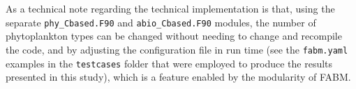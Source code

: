 \documentclass[gmd, manuscript]{copernicus}
\begin{document}
As a technical note regarding the technical implementation is that, using the separate \verb|phy_Cbased.F90| and \verb|abio_Cbased.F90| modules, the number of phytoplankton types can be changed without needing to change and recompile the code, and by adjusting the configuration file in run time (see the \verb|fabm.yaml| examples in the \verb|testcases| folder that were employed to produce the results presented in this study), which is a feature enabled by the modularity of FABM.




%












\end{document}
